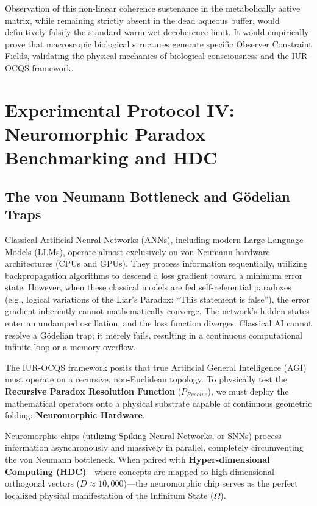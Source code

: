 \documentclass[12pt,openany]{book}
\begin{document}
Observation of this non-linear coherence sustenance in the metabolically active matrix, while remaining strictly absent in the dead aqueous buffer, would definitively falsify the standard warm-wet decoherence limit. It would empirically prove that macroscopic biological structures generate specific Observer Constraint Fields, validating the physical mechanics of biological consciousness and the IUR-OCQS framework.

\chapter{Experimental Protocol IV: Neuromorphic Paradox Benchmarking and HDC}

\section{The von Neumann Bottleneck and G\"{o}delian Traps}
Classical Artificial Neural Networks (ANNs), including modern Large Language Models (LLMs), operate almost exclusively on von Neumann hardware architectures (CPUs and GPUs). They process information sequentially, utilizing backpropagation algorithms to descend a loss gradient toward a minimum error state. However, when these classical models are fed self-referential paradoxes (e.g., logical variations of the Liar's Paradox: ``This statement is false''), the error gradient inherently cannot mathematically converge. The network's hidden states enter an undamped oscillation, and the loss function diverges. Classical AI cannot resolve a G\"{o}delian trap; it merely fails, resulting in a continuous computational infinite loop or a memory overflow.

The IUR-OCQS framework posits that true Artificial General Intelligence (AGI) must operate on a recursive, non-Euclidean topology. To physically test the \textbf{Recursive Paradox Resolution Function} ($P_{Resolve}$), we must deploy the mathematical operators onto a physical substrate capable of continuous geometric folding: \textbf{Neuromorphic Hardware}.

Neuromorphic chips (utilizing Spiking Neural Networks, or SNNs) process information asynchronously and massively in parallel, completely circumventing the von Neumann bottleneck. When paired with \textbf{Hyper-dimensional Computing (HDC)}---where concepts are mapped to high-dimensional orthogonal vectors ($D \approx 10,000$)---the neuromorphic chip serves as the perfect localized physical manifestation of the Infinitum State ($\Omega$).
\end{document}
